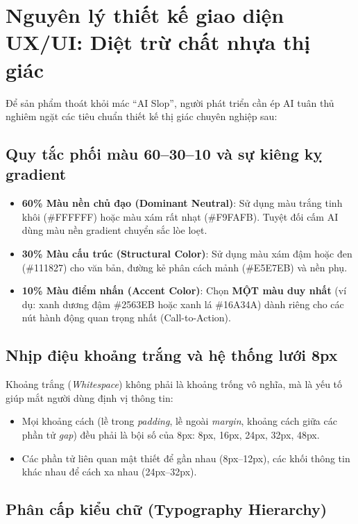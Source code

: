 \documentclass[a4paper,11pt]{article}
\begin{document}
\section{Nguyên lý thiết kế giao diện UX/UI: Diệt trừ chất nhựa thị giác}

Để sản phẩm thoát khỏi mác ``AI Slop'', người phát triển cần ép AI tuân thủ nghiêm ngặt các tiêu chuẩn thiết kế thị giác chuyên nghiệp sau:

\subsection{Quy tắc phối màu 60--30--10 và sự kiêng kỵ gradient}

\begin{itemize}[leftmargin=1.5em]
    \item \textbf{60\% Màu nền chủ đạo (Dominant Neutral)}: Sử dụng màu trắng tinh khôi (\#FFFFFF) hoặc màu xám rất nhạt (\#F9FAFB). Tuyệt đối cấm AI dùng màu nền gradient chuyển sắc lòe loẹt.
    \item \textbf{30\% Màu cấu trúc (Structural Color)}: Sử dụng màu xám đậm hoặc đen (\#111827) cho văn bản, đường kẻ phân cách mảnh (\#E5E7EB) và nền phụ.
    \item \textbf{10\% Màu điểm nhấn (Accent Color)}: Chọn \textbf{MỘT màu duy nhất} (ví dụ: xanh dương đậm \#2563EB hoặc xanh lá \#16A34A) dành riêng cho các nút hành động quan trọng nhất (Call-to-Action).
\end{itemize}

\subsection{Nhịp điệu khoảng trắng và hệ thống lưới 8px}

Khoảng trắng (\textit{Whitespace}) không phải là khoảng trống vô nghĩa, mà là yếu tố giúp mắt người dùng định vị thông tin:
\begin{itemize}[leftmargin=1.5em]
    \item Mọi khoảng cách (lề trong \textit{padding}, lề ngoài \textit{margin}, khoảng cách giữa các phần tử \textit{gap}) đều phải là bội số của 8px: 8px, 16px, 24px, 32px, 48px.
    \item Các phần tử liên quan mật thiết để gần nhau (8px--12px), các khối thông tin khác nhau để cách xa nhau (24px--32px).
\end{itemize}

\subsection{Phân cấp kiểu chữ (Typography Hierarchy)}
\end{document}
